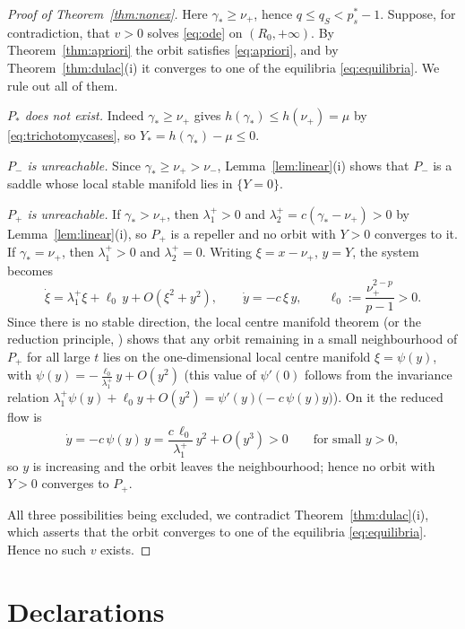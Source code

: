 \documentclass[11pt,reqno]{amsart}
\numberwithin{equation}{section}
\theoremstyle{plain}
\theoremstyle{definition}
\newcommand{\gs}{\gamma_{*}}
\begin{document}
\begin{proof}[Proof of Theorem~\ref{thm:nonex}]
Here $\gs\ge\nu_{+}$, hence $q\le q_{S}<p^{*}_{s}-1$. Suppose, for
contradiction, that $v>0$ solves \eqref{eq:ode} on $(R_{0},+\infty)$. By
Theorem~\ref{thm:apriori} the orbit satisfies
\eqref{eq:apriori}, and by Theorem~\ref{thm:dulac}(i) it converges to one of the
equilibria \eqref{eq:equilibria}. We rule out all of them.

\emph{$P_{*}$ does not exist.} Indeed $\gs\ge\nu_{+}$ gives $h(\gs)\le
h(\nu_{+})=\mu$ by \eqref{eq:trichotomycases}, so $Y_{*}=h(\gs)-\mu\le0$.

\emph{$P_{-}$ is unreachable.} Since $\gs\ge\nu_{+}>\nu_{-}$,
Lemma~\ref{lem:linear}(i) shows that $P_{-}$ is a saddle whose local stable
manifold lies in $\{Y=0\}$.

\emph{$P_{+}$ is unreachable.} If $\gs>\nu_{+}$, then
$\lambda_{1}^{+}>0$ and $\lambda_{2}^{+}=c(\gs-\nu_{+})>0$ by
Lemma~\ref{lem:linear}(i), so $P_{+}$ is a repeller and no orbit with $Y>0$
converges to it. If $\gs=\nu_{+}$, then $\lambda_{1}^{+}>0$ and
$\lambda_{2}^{+}=0$. Writing $\xi=x-\nu_{+}$, $y=Y$, the system becomes
\[
\dot\xi=\lambda_{1}^{+}\xi+\ell_{0}\,y+O(\xi^{2}+y^{2}),
\qquad
\dot y=-c\,\xi\,y,
\qquad \ell_{0}:=\frac{\nu_{+}^{2-p}}{p-1}>0 .
\]
Since there is no stable direction, the local centre manifold theorem
\cite{Carr} (or the reduction principle, \cite[Ch.~IX]{Hartman}) shows that any
orbit remaining in a small neighbourhood of $P_{+}$ for all large $t$ lies on
the one-dimensional local centre manifold $\xi=\psi(y)$, with
$\psi(y)=-\frac{\ell_{0}}{\lambda_{1}^{+}}y+O(y^{2})$ (this value of $\psi'(0)$
follows from the invariance relation
$\lambda_{1}^{+}\psi(y)+\ell_{0}y+O(y^{2})=\psi'(y)\big(-c\,\psi(y)y\big)$).
On it the reduced flow is
\[
\dot y=-c\,\psi(y)\,y=\frac{c\,\ell_{0}}{\lambda_{1}^{+}}\,y^{2}+O(y^{3})>0
\qquad\text{for small }y>0 ,
\]
so $y$ is increasing and the orbit leaves the neighbourhood; hence no orbit with
$Y>0$ converges to $P_{+}$.

All three possibilities being excluded, we contradict
Theorem~\ref{thm:dulac}(i), which asserts that the orbit converges to one of the
equilibria \eqref{eq:equilibria}. Hence no such $v$ exists.
\end{proof}

\section*{Declarations}

\end{document}
